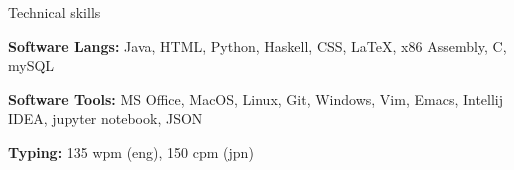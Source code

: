 \documentclass{resume} %
\begin{document}

\begin{rSection}{Technical skills}
	\item \textbf{Software Langs:} 
    	Java, HTML, Python, Haskell, CSS, \LaTeX, x86 Assembly, C, mySQL
	\item \textbf{Software Tools:} 
    	MS Office, MacOS, Linux, Git, Windows, Vim, Emacs, Intellij IDEA, jupyter notebook, JSON
	\item \textbf{Typing:} 135 wpm (eng), 150 cpm (jpn)
\end{rSection}

\end{document}
